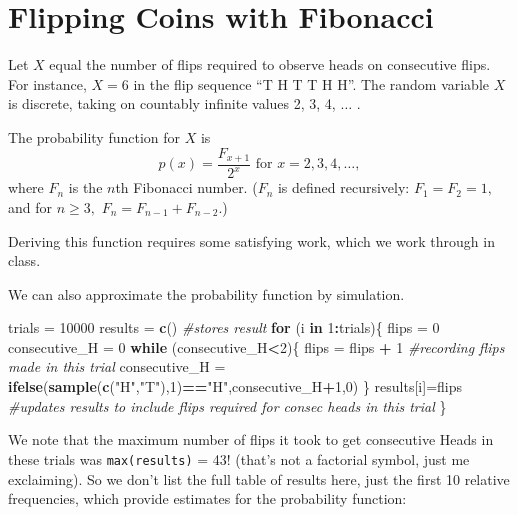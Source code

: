 \documentclass[
]{book}
\newenvironment{Shaded}{\begin{snugshade}}{\end{snugshade}}
\newcommand{\CommentTok}[1]{\textcolor[rgb]{0.56,0.35,0.01}{\textit{#1}}}
\newcommand{\ControlFlowTok}[1]{\textcolor[rgb]{0.13,0.29,0.53}{\textbf{#1}}}
\newcommand{\DecValTok}[1]{\textcolor[rgb]{0.00,0.00,0.81}{#1}}
\newcommand{\FunctionTok}[1]{\textcolor[rgb]{0.13,0.29,0.53}{\textbf{#1}}}
\newcommand{\NormalTok}[1]{#1}
\newcommand{\OtherTok}[1]{\textcolor[rgb]{0.56,0.35,0.01}{#1}}
\newcommand{\SpecialCharTok}[1]{\textcolor[rgb]{0.81,0.36,0.00}{\textbf{#1}}}
\newcommand{\StringTok}[1]{\textcolor[rgb]{0.31,0.60,0.02}{#1}}
\theoremstyle{definition}
\theoremstyle{definition}
\theoremstyle{definition}
\theoremstyle{definition}
\theoremstyle{remark}
\begin{document}
\section{Flipping Coins with Fibonacci}\label{flipping-coins-with-fibonacci}

Let \(X\) equal the number of flips required to observe heads on consecutive flips. For instance, \(X = 6\) in the flip sequence ``T H T T H H''. The random variable \(X\) is discrete, taking on countably infinite values 2, 3, 4, \(\ldots\) .

The probability function for \(X\) is \[p(x) = \frac{F_{x+1}}{2^x} \text{     for } x = 2, 3, 4, \ldots,\] where \(F_n\) is the \(n\)th Fibonacci number. (\(F_n\) is defined recursively: \(F_1 = F_2 = 1,\) and for \(n \geq 3,\) \(F_n = F_{n-1}+F_{n-2}\).)

Deriving this function requires some satisfying work, which we work through in class.

We can also approximate the probability function by simulation.

\begin{Shaded}
\begin{Highlighting}[]
\NormalTok{trials }\OtherTok{=} \DecValTok{10000}
\NormalTok{results }\OtherTok{=} \FunctionTok{c}\NormalTok{() }\CommentTok{\#stores result}
\ControlFlowTok{for}\NormalTok{ (i }\ControlFlowTok{in} \DecValTok{1}\SpecialCharTok{:}\NormalTok{trials)\{}
\NormalTok{  flips }\OtherTok{=} \DecValTok{0}
\NormalTok{  consecutive\_H }\OtherTok{=} \DecValTok{0}
  \ControlFlowTok{while}\NormalTok{ (consecutive\_H}\SpecialCharTok{\textless{}}\DecValTok{2}\NormalTok{)\{}
\NormalTok{    flips }\OtherTok{=}\NormalTok{ flips }\SpecialCharTok{+} \DecValTok{1} \CommentTok{\#recording flips made in this trial}
\NormalTok{    consecutive\_H }\OtherTok{=} \FunctionTok{ifelse}\NormalTok{(}\FunctionTok{sample}\NormalTok{(}\FunctionTok{c}\NormalTok{(}\StringTok{"H"}\NormalTok{,}\StringTok{"T"}\NormalTok{),}\DecValTok{1}\NormalTok{)}\SpecialCharTok{==}\StringTok{"H"}\NormalTok{,consecutive\_H}\SpecialCharTok{+}\DecValTok{1}\NormalTok{,}\DecValTok{0}\NormalTok{)}
\NormalTok{  \}}
\NormalTok{  results[i]}\OtherTok{=}\NormalTok{flips }\CommentTok{\#updates results to include flips required for consec heads in this trial}
\NormalTok{\}}
\end{Highlighting}
\end{Shaded}

We note that the maximum number of flips it took to get consecutive Heads in these trials was \texttt{max(results)} = 43! (that's not a factorial symbol, just me exclaiming). So we don't list the full table of results here, just the first 10 relative frequencies, which provide estimates for the probability function:
\end{document}
